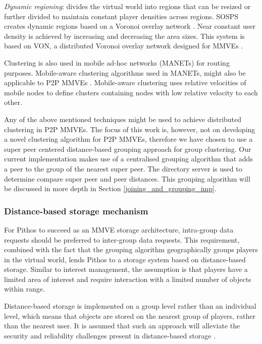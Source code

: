 \emph{Dynamic regioning}: divides the virtual world into regions that can be resized or further divided to maintain constant player densities across regions. SOSPS \cite{self_organising_sps_post} creates dynamic regions based on a Voronoi overlay network \cite{voronoi_diagrams_survey}. Near constant user density is achieved by increasing and decreasing the area sizes. This system is based on VON, a distributed Voronoi overlay network designed for MMVEs \cite{VON_VAST}.

Clustering is also used in mobile ad-hoc networks (MANETs) for routing purposes. Mobile-aware clustering algorithms used in MANETs, might also be applicable to P2P MMVEs \cite{clustering_survey}. Mobile-aware clustering uses relative velocities of mobile nodes to define clusters containing nodes with low relative velocity to each other.

Any of the above mentioned techniques might be used to achieve distributed clustering in P2P MMVEs. The focus of this work is, however, not on developing a novel clustering algorithm for P2P MMVEs, therefore we have chosen to use a super peer centered distance-based grouping approach for group clustering. Our current implementation makes use of a centralised grouping algorithm that adds a peer to the group of the nearest super peer. The directory server is used to determine compare super peer and peer distances. This grouping algorithm will be discussed in more depth in Section \ref{joining_and_grouping_imp}.

\subsubsection{Distance-based storage mechanism}
\label{distance_based_design}

For Pithos to succeed as an MMVE storage architecture, intra-group data requests should be preferred to inter-group data requests. This requirement, combined with the fact that the grouping algorithm geographically groups players in the virtual world, lends Pithos to a storage system based on distance-based storage. Similar to interest management, the assumption is that players have a limited area of interest and require interaction with a limited number of objects within range.

Distance-based storage is implemented on a group level rather than an individual level, which means that objects are stored on the nearest group of players, rather than the nearest user. It is assumed that such an approach will alleviate the security and reliability challenges present in distance-based storage \cite{gilmore_p2p_mmog_state_persistency}.

